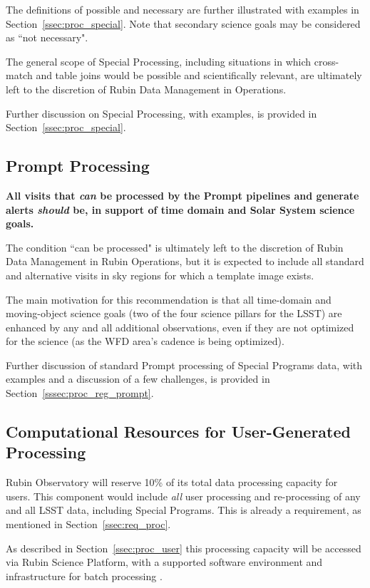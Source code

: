 The definitions of possible and necessary are further illustrated with examples in Section~\ref{ssec:proc_special}.
Note that secondary science goals may be considered as ``not necessary".

The general scope of Special Processing, including situations in which cross-match and table joins 
would be possible and scientifically relevant, 
are ultimately left to the discretion of Rubin Data Management in Operations.

Further discussion on Special Processing, with examples, is provided in Section~\ref{ssec:proc_special}.

\subsection{Prompt Processing}\label{ssec:sci_pproc}

\textbf{All visits that \emph{can} be processed by the Prompt pipelines and generate 
alerts \emph{should} be, in support of time domain and Solar System science goals.}

The condition ``can be processed" is ultimately left to the discretion of
Rubin Data Management in Rubin Operations, but it is expected to include
all standard and alternative visits in sky regions for which a template image exists.

The main motivation for this recommendation is that all time-domain and 
moving-object science goals (two of the four science pillars for the LSST) are
enhanced by any and all additional observations, even if they are not
optimized for the science (as the WFD area's cadence is being optimized).

Further discussion of standard Prompt processing of Special Programs data, with
examples and a discussion of a few challenges,
is provided in Section~\ref{sssec:proc_reg_prompt}.

\subsection{Computational Resources for User-Generated Processing}\label{ssec:sci_comp}

Rubin Observatory will reserve 10\% of its total data processing capacity for users.
This component would include {\it all} user processing and re-processing of any and 
all LSST data, including Special Programs. 
This is already a requirement, as mentioned in Section~\ref{ssec:req_proc}.

As described in Section~\ref{ssec:proc_user} this processing capacity will be 
accessed via Rubin Science Platform, with a supported software environment and 
infrastructure for batch processing .

